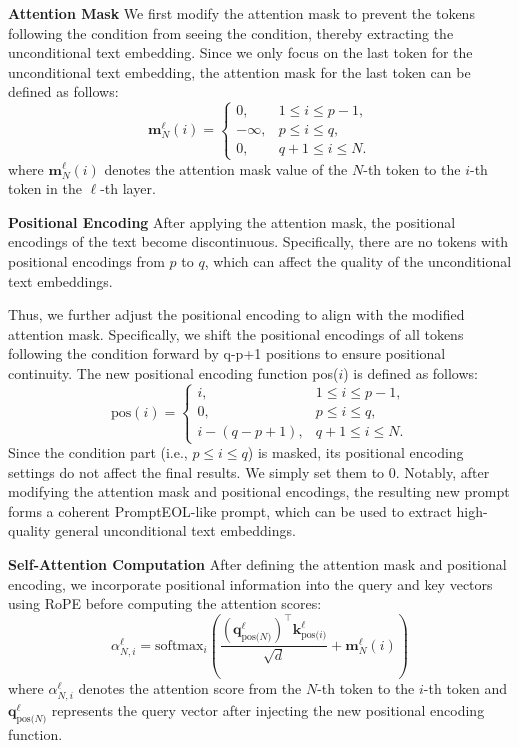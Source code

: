 \documentclass[11pt]{article}
\begin{document}
\textbf{Attention Mask} We first modify the attention mask to prevent the tokens following the condition from seeing the condition, thereby extracting the unconditional text embedding.
Since we only focus on the last token for the unconditional text embedding, the attention mask for the last token can be defined as follows:
\[
\mathbf{m}^{\ell}_N(i) =
\begin{cases}
0, & 1 \leq i \leq p-1, \\
-\infty, & p \leq i \leq q, \\
0, & q+1 \leq i \leq N .
\end{cases}
\]
where $\mathbf{m}^{\ell}_N(i)$ denotes the attention mask value of the $N$-th token to the $i$-th token in the $\ell$-th layer.

\textbf{Positional Encoding} After applying the attention mask, the positional encodings of the text become discontinuous.
Specifically, there are no tokens with positional encodings from $p$ to $q$, which can affect the quality of the unconditional text embeddings.

Thus, we further adjust the positional encoding to align with the modified attention mask.
Specifically, we shift the positional encodings of all tokens following the condition forward by q-p+1 positions to ensure positional continuity.
The new positional encoding function pos($i$) is defined as follows:
\[
\text{pos}(i) =
\begin{cases}
i, & 1 \le i \le p-1, \\
0, & p \le i \le q, \\
i - (q-p+1), & q+1 \le i \le N.
\end{cases}
\]
Since the condition part (i.e., $p \le i \le q$) is masked, its positional encoding settings do not affect the final results.
We simply set them to 0.
Notably, after modifying the attention mask and positional encodings, the resulting new prompt forms a coherent PromptEOL-like prompt, which can be used to extract high-quality general unconditional text embeddings.

\textbf{Self-Attention Computation}
After defining the attention mask and positional encoding, we incorporate positional information into the query and key vectors using RoPE before computing the attention scores:
\[
\alpha^{\ell}_{N,i} 
= 
\text{softmax}_i(\frac{
    (\mathbf{q}^{\ell}_{\text{pos($N$)}})^{\!\top}
    \mathbf{k}^{\ell}_{\text{pos($i$)}}
}{\sqrt{d}}
+ \mathbf{m}^{\ell}_N(i))
\]
where $\alpha^{\ell}_{N,i}$ denotes the attention score from the $N$-th token to the $i$-th token and $\mathbf{q}^{\ell}_{\text{pos($N$)}}$ represents the query vector after injecting the new positional encoding function.
\end{document}

